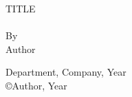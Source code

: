 \begin{titlepage}
\begin{center}
\thispagestyle{plain}
 \setcounter{page}{1}

\begin{doublespace}

\vspace*{\fill}
\LARGE
TITLE\\~\\By\\Author
\end{doublespace}

\vfill
\large
Department, Company, Year\\
\copyright Author, Year

\end{center}
\end{titlepage}